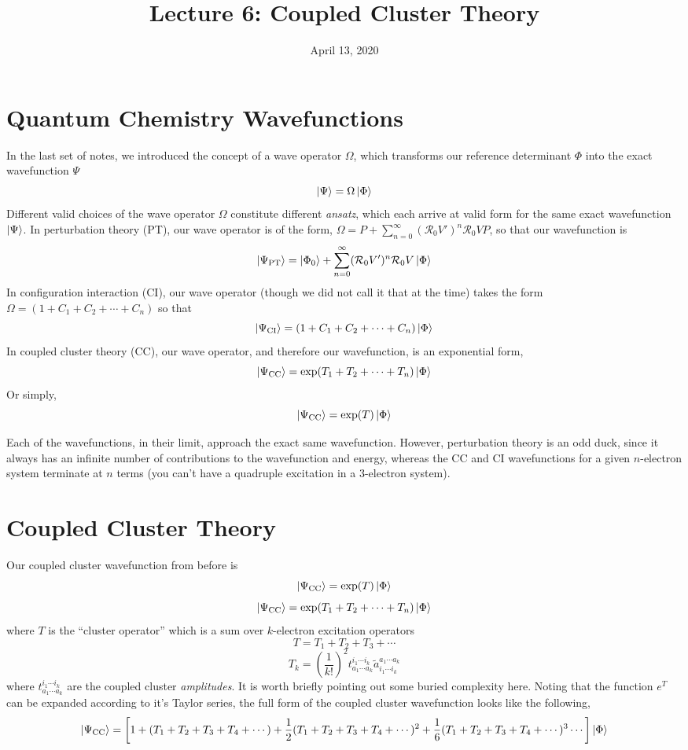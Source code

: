 \documentclass{article}
\title{Lecture 6: Coupled Cluster Theory}
\date{April 13, 2020}
\newcommand{\Rz}{\mathcal{R}_{0}}
\begin{document}
\maketitle
\noindent

\section{Quantum Chemistry Wavefunctions}
In the last set of notes, we introduced the concept of a wave operator $\Omega$, which transforms 
    our reference determinant $\Phi$ into the exact wavefunction $\Psi$
\[\ket{\Psi} = \Omega \ket{\Phi} \]
Different valid choices of the wave operator  $\Omega$ constitute different \textit{ansatz},  
    which each arrive at valid form for the same exact wavefunction $\ket{\Psi}$.
In perturbation theory (PT), our wave operator is of the form,
$\Omega = P + \sum_{n=0}^{\infty} (\Rz V')^n \Rz V P$, so that our wavefunction is
\[\ket{\Psi_{\mathrm{PT}}} =  \ket{\Phi_0} + \sum_{n=0}^{\infty} (\Rz V')^n \Rz V \ket{\Phi} \]
In configuration interaction (CI), our wave operator (though we did not call it that at the time)
takes the form $\Omega = (1 + C_1 + C_2 + \cdots + C_n)$ so that 
\[\ket{\Psi_{\mathrm{CI}}} = (1 + C_1 + C_2 + \cdots + C_n) \ket{\Phi} \]
In coupled cluster theory (CC), our wave operator, and therefore our wavefunction, 
is an exponential form,
\[\ket{\Psi_{\mathrm{CC}}} = \exp(T_1 + T_2 + \cdots + T_n) \ket{\Phi} \]
Or simply, 
\[\ket{\Psi_{\mathrm{CC}}} = \exp(T) \ket{\Phi} \]

Each of the wavefunctions, in their limit, approach the exact same wavefunction.
However, perturbation theory is an odd duck, since it always has an infinite number of
    contributions to the wavefunction and energy, 
    whereas the CC and CI wavefunctions for a given $n$-electron system 
    terminate at $n$ terms (you can't have a quadruple excitation in a 3-electron system). 

\section{Coupled Cluster Theory}
Our coupled cluster wavefunction from before is 
\[\ket{\Psi_{\mathrm{CC}}} = \exp(T) \ket{\Phi} \]
\[\ket{\Psi_{\mathrm{CC}}} = \exp(T_1 + T_2 + \cdots + T_n) \ket{\Phi} \]
where $T$ is the ``cluster operator'' which is a sum over
$k$-electron excitation operators
\[T = T_1 + T_2 + T_3 + \cdots \]
\[T_k = \left(\frac{1}{k!}\right)^2 t_{a_1 \cdots a_k}^{i_1 \cdots i_k } \tilde{a}_{i_1 \cdots i_k}^{a_1 \cdots a_k } \]
where $t_{a_1 \cdots a_k}^{i_1 \cdots i_k }$ are the coupled cluster \textit{amplitudes}.
It is worth briefly pointing out some buried complexity here. Noting that the function $e^T$ can be expanded according to it's Taylor series, the full form of the coupled cluster wavefunction
looks like the following, 
\[ \ket{\Psi_{\mathrm{CC}}} = \left[ 1 + (T_1 + T_2 + T_3 + T_4 + \cdots ) + \frac{1}{2} (T_1 + T_2 + T_3 + T_4 + \cdots)^2 +  \frac{1}{6} (T_1 + T_2 + T_3 + T_4 + \cdots)^3 \cdots \right] \ket{\Phi}  \]
\end{document}
